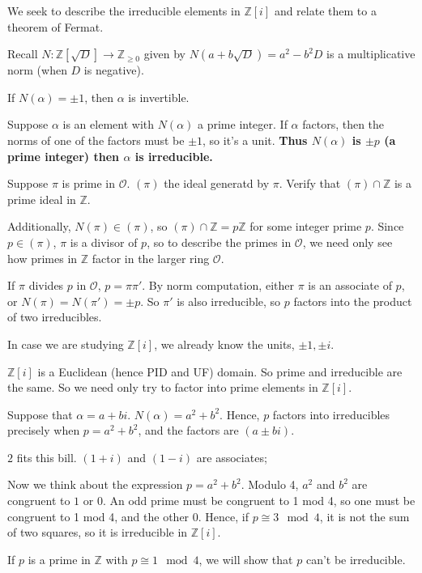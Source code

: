 \documentclass[12pt]{article}
\newcommand{\bbZ}{\mathbb{Z}}
\newcommand{\calO}{\mathcal{O}}
\begin{document}
We seek to describe the irreducible elements in $\bbZ[i]$ and relate
them to a theorem of Fermat.
\begin{description}
\item Recall $N: \bbZ[\sqrt{D}] \rightarrow \bbZ_{\geq 0} $ given by
  $N(a+b\sqrt{D}) = a^2-b^2D$ is a multiplicative norm (when $D$ is
  negative). 
\item[Exercise] If $N(\alpha)=\pm 1$, then $\alpha$ is invertible. 
\item Suppose $\alpha$ is an element with $N(\alpha)$ a prime
  integer. If $\alpha$ factors, then the norms of one of the factors
  must be $\pm 1$, so it's a unit. {\bf Thus $N(\alpha)$ is $\pm p$ (a
  prime integer) then $\alpha$ is irreducible. }
\item Suppose $\pi$ is prime in $\calO$. $(\pi)$ the ideal generatd by
  $\pi$. Verify that $(\pi) \cap \bbZ$ is a prime ideal in $\bbZ$. 
\item Additionally, $N(\pi)\in (\pi)$, so $(\pi) \cap \bbZ=p\bbZ$ for
  some integer prime $p$. Since $p\in (\pi)$, $\pi$ is a divisor of
  $p$, so to describe the primes in $\calO$, we need only see how
  primes in $\bbZ$ factor in the larger ring $\calO$. 
\item If $\pi$ divides $p$ in $\calO$, $p=\pi \pi'$. By norm
  computation, either $\pi$ is an associate of $p$, or
  $N(\pi)=N(\pi')=\pm p$. So $\pi'$ is also irreducible, so $p$
  factors into the product of two irreducibles.
\item In case we are studying $\bbZ[i]$, we already know the units,
  $\pm 1, \pm i$. 
\item $\bbZ[i]$ is a Euclidean (hence PID and UF) domain. So prime and
  irreducible are the same. So we need only try to factor into prime
  elements in $\bbZ[i]$. 
\item Suppose that $\alpha=a+bi$. $N(\alpha)=a^2+b^2$. Hence, $p$
  factors into irreducibles precisely when $p=a^2+b^2$, and the
  factors are $(a\pm bi)$. 
\item $2$ fits this bill. $(1+i)$ and $(1-i)$ are associates;
\item Now we think about the expression $p=a^2+b^2$. Modulo 4, $a^2$
  and $b^2$ are congruent to $1$ or $0$. An odd prime must be
  congruent to 1 mod 4, so one must be congruent to 1 mod 4, and the
  other 0. Hence, if $p\cong 3 \mod 4$, it is not the sum of two
  squares, so it is irreducible in $\bbZ[i]$. 
\item If $p$ is a prime in $\bbZ$ with $p\cong 1 \mod 4$, we will
  show that $p$ can't be irreducible. 
\end{description}
\end{document}
